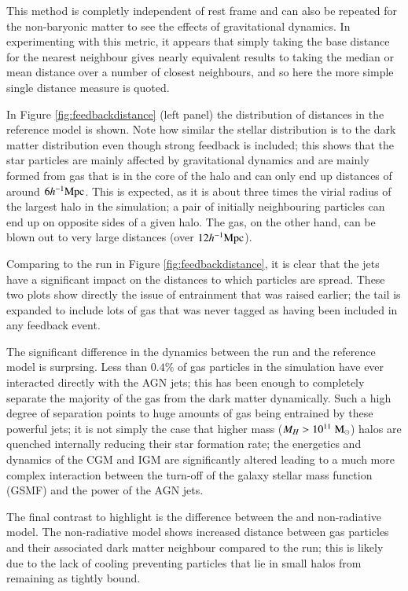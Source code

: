 This method is completly independent of rest frame and can also be repeated
for the non-baryonic matter to see the effects of gravitational dynamics. In
experimenting with this metric, it appears that simply taking the base
distance for the nearest neighbour gives nearly equivalent results to taking
the median or mean distance over a number of closest neighbours, and so here
the more simple single distance measure is quoted.

In Figure \ref{fig:feedbackdistance} (left panel) the distribution of
distances in the reference model is shown. Note how similar the stellar
distribution is to the dark matter distribution even though strong feedback is
included; this shows that the star particles are mainly affected by
gravitational dynamics and  are mainly formed from gas that is in the core of
the halo and can only end up distances of around $6 h^{-1}{\rm Mpc}{}$. This is
expected, as it is about three times the virial radius of the largest halo in
the simulation; a pair of initially neighbouring particles can end up on
opposite sides of a given halo. The gas, on the other hand, can be blown out
to very large distances (over $12 h^{-1}{\rm Mpc}{}$).

Comparing to the \nojet{} run in Figure \ref{fig:feedbackdistance}, it is clear
that the jets have a significant impact on the distances to which particles
are spread. These two plots show directly the issue of entrainment that was
raised earlier; the tail is expanded to include lots of gas that was never
tagged as having been included in any feedback event.

The significant difference in the dynamics between the \nojet{} run and the
reference model is surprsing. Less than $0.4\%$ of gas particles in the simulation
have ever interacted directly with the AGN jets; this has been enough
to completely separate the majority of the gas from the dark matter dynamically.
Such a high degree of separation points to huge amounts of gas being entrained
by these powerful jets; it is not simply the case that higher mass ($M_H >
10^{11} \;{\rm M}_{\odot}{}$) halos are quenched internally reducing their star formation
rate; the energetics and dynamics of the CGM and IGM are significantly altered
leading to a much more complex interaction between the turn-off of the
galaxy stellar mass function (GSMF) and the power of the AGN jets.

The final contrast to highlight is the difference between the \nojet{} and
non-radiative model. The non-radiative model shows increased distance between
gas particles and their associated dark matter neighbour compared to the
\nojet{} run; this is likely due to the lack of cooling preventing particles
that lie in small halos from remaining as tightly bound.

